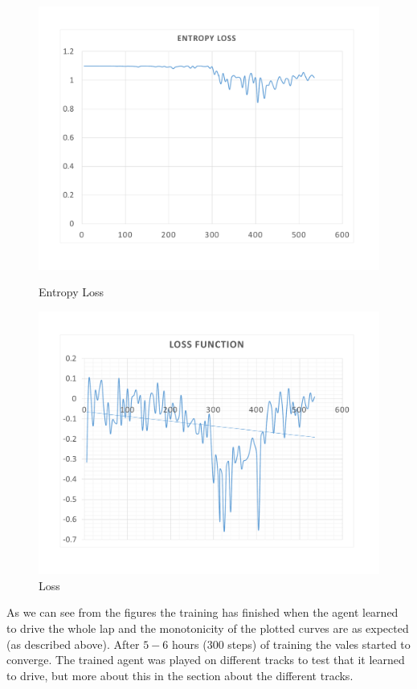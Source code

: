\begin{figure}[H]
	\includegraphics[width=\linewidth]{Figures/EntropyLoss}
	\caption{Entropy Loss}\label{fig:EntropyLoss}
	\endminipage\hfill
	\includegraphics[width=\linewidth]{Figures/Loss}
	\caption{Loss}\label{fig:Loss}
	\endminipage
\end{figure}

As we can see from the figures the training has finished when the agent learned to drive the whole lap and the monotonicity of the plotted curves are as expected (as described above). After $5-6$ hours ($300$ steps) of training the vales started to converge. The trained agent was played on different tracks to test that it learned to drive, but more about this in the section about the different tracks.

